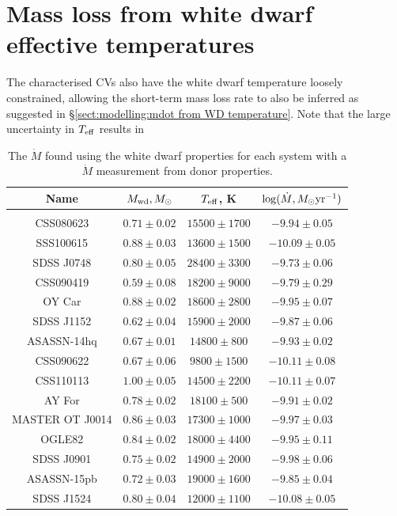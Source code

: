 \section{Mass loss from white dwarf effective temperatures}

The characterised CVs also have the white dwarf temperature loosely constrained, allowing the short-term mass loss rate to also be inferred as suggested in \S\ref{sect:modelling:mdot from WD temperature}. Note that the large uncertainty in $T_{\rm eff}$ results in

\begin{table}
    \centering
    \caption{The $\dot M$ found using the white dwarf properties for each system with a $\dot M$ measurement from donor properties.}
    \label{table:results:Mdot from white dwarf parameters}
    \begin{tabular}{cccc}
        \hline
        \textbf{Name} & \textbf{$M_{\rm wd}, M_\odot$} & \textbf{$T_{\rm eff}$, K} & \textbf{$\log (\dot M, M_\odot {\rm yr}^{-1})$} \\
        \hline \hline \\
        CSS080623       & $0.71 \pm 0.02$       & $15500 \pm 1700$      & $ -9.94 \pm 0.05$ \\
        SSS100615       & $0.88 \pm 0.03$       & $13600 \pm 1500$      & $-10.09 \pm 0.05$ \\
        SDSS J0748      & $0.80 \pm 0.05$       & $28400 \pm 3300$      & $ -9.73 \pm 0.06$ \\
        CSS090419       & $0.59 \pm 0.08$       & $18200 \pm 9000$      & $ -9.79 \pm 0.29$ \\
        OY Car          & $0.88 \pm 0.02$       & $18600 \pm 2800$      & $ -9.95 \pm 0.07$ \\
        SDSS J1152      & $0.62 \pm 0.04$       & $15900 \pm 2000$      & $ -9.87 \pm 0.06$ \\
        ASASSN-14hq     & $0.67 \pm 0.01$       & $14800 \pm  800$      & $ -9.93 \pm 0.02$ \\
        CSS090622       & $0.67 \pm 0.06$       & $ 9800 \pm 1500$      & $-10.11 \pm 0.08$ \\
        CSS110113       & $1.00 \pm 0.05$       & $14500 \pm 2200$      & $-10.11 \pm 0.07$ \\
        AY For          & $0.78 \pm 0.02$       & $18100 \pm  500$      & $ -9.91 \pm 0.02$ \\
        MASTER OT J0014 & $0.86 \pm 0.03$       & $17300 \pm 1000$      & $ -9.97 \pm 0.03$ \\
        OGLE82          & $0.84 \pm 0.02$       & $18000 \pm 4400$      & $ -9.95 \pm 0.11$ \\
        SDSS J0901      & $0.75 \pm 0.02$       & $14900 \pm 2000$      & $ -9.98 \pm 0.06$ \\
        ASASSN-15pb     & $0.72 \pm 0.03$       & $19000 \pm 1600$      & $ -9.85 \pm 0.04$ \\
        SDSS J1524      & $0.80 \pm 0.04$       & $12000 \pm 1100$      & $-10.08 \pm 0.05$ \\
        \hline
    \end{tabular}
\end{table}